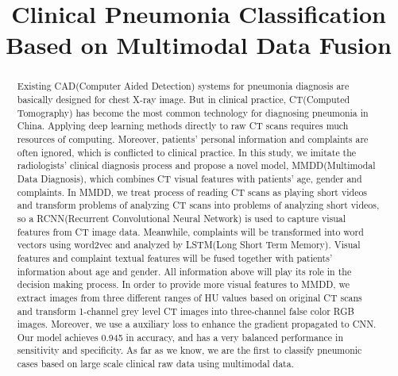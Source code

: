 \documentclass[runningheads]{llncs}
\begin{document}
%
\title{Clinical Pneumonia Classification Based on Multimodal Data Fusion}
%
%
\author{
}
%
\authorrunning{}
%
\institute{
}
%
\maketitle              %
%
\begin{abstract}
Existing CAD(Computer Aided Detection) systems for pneumonia diagnosis are basically designed for chest X-ray image. But in clinical practice, CT(Computed Tomography) has become the most common technology for diagnosing pneumonia in China. Applying deep learning methods directly to raw CT scans requires much resources of computing. Moreover, patients' personal information and complaints are often ignored, which is conflicted to clinical practice.
In this study, we imitate the radiologists' clinical diagnosis process and propose a novel model, MMDD(Multimodal Data Diagnosis), which combines CT visual features with patients' age, gender and complaints. 
In MMDD, we treat process of reading CT scans as playing short videos and transform problems of analyzing CT scans into problems of analyzing short videos, so a RCNN(Recurrent Convolutional Neural Network) is used to capture visual features from CT image data. Meanwhile, complaints will be transformed into word vectors using word2vec and analyzed by LSTM(Long Short Term Memory). Visual features and complaint textual features will be fused together with patients' information about age and gender. All information above will play its role in the decision making process.
In order to provide more visual features to MMDD, we extract images from three different ranges of HU values based on original CT scans and transform 1-channel grey level CT images into three-channel false color RGB images. Moreover, we use a auxiliary loss to enhance the gradient propagated to CNN. 
Our model achieves 0.945 in accuracy, and has a very balanced performance in sensitivity and specificity. As far as we know, we are the first to classify pneumonic cases based on large scale clinical raw data using multimodal data.


\end{abstract}
\end{document}
